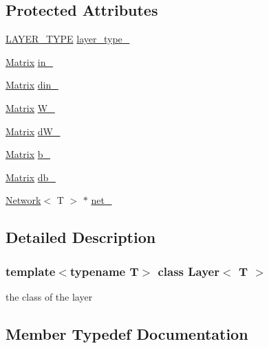 \subsection*{Protected Attributes}
\begin{DoxyCompactItemize}
\item 
\mbox{\hyperlink{layer__base_8hpp_a5f7e99058765b058df158c099200b154}{L\+A\+Y\+E\+R\+\_\+\+T\+Y\+PE}} \mbox{\hyperlink{class_layer_af60ad69b5833427d6a6a4d49db902d76}{layer\+\_\+type\+\_\+}}
\item 
\mbox{\hyperlink{class_layer_a22b1e7286096aa62bd245536c8ebdaf1}{Matrix}} \mbox{\hyperlink{class_layer_a9482c992e218f5da65c4345be1dd7447}{in\+\_\+}}
\item 
\mbox{\hyperlink{class_layer_a22b1e7286096aa62bd245536c8ebdaf1}{Matrix}} \mbox{\hyperlink{class_layer_adcac12db650e05e0e5c664c304231604}{din\+\_\+}}
\item 
\mbox{\hyperlink{class_layer_a22b1e7286096aa62bd245536c8ebdaf1}{Matrix}} \mbox{\hyperlink{class_layer_a1dd882f1ce286b7d36aa4d14c815b2d3}{W\+\_\+}}
\item 
\mbox{\hyperlink{class_layer_a22b1e7286096aa62bd245536c8ebdaf1}{Matrix}} \mbox{\hyperlink{class_layer_ab02d1e3e853bef3aadffc312ba847f44}{d\+W\+\_\+}}
\item 
\mbox{\hyperlink{class_layer_a22b1e7286096aa62bd245536c8ebdaf1}{Matrix}} \mbox{\hyperlink{class_layer_ab200edbfbb0a0a7ee305d1371feb2815}{b\+\_\+}}
\item 
\mbox{\hyperlink{class_layer_a22b1e7286096aa62bd245536c8ebdaf1}{Matrix}} \mbox{\hyperlink{class_layer_a4ff69fa1c45333cbef24f12d190f26a5}{db\+\_\+}}
\item 
\mbox{\hyperlink{class_network}{Network}}$<$ T $>$ $\ast$ \mbox{\hyperlink{class_layer_a5c55f43a191e4fed38002316ca71b4ff}{net\+\_\+}}
\end{DoxyCompactItemize}


\subsection{Detailed Description}
\subsubsection*{template$<$typename T$>$\newline
class Layer$<$ T $>$}

the class of the layer 



\subsection{Member Typedef Documentation}
\mbox{\label{class_layer_a22b1e7286096aa62bd245536c8ebdaf1}} 
